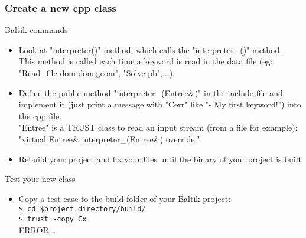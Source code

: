 \documentclass[10pt, hyperref={unicode=true,pdfusetitle, bookmarks=true,bookmarksnumbered=false,bookmarksopen=false, breaklinks=false,pdfborder={0 0 1},backref=true,colorlinks=true,linkcolor=darkblue,pageanchor, urlcolor=darkblue}]{beamer}
\begin{document}
\begin{frame}
\frametitle{Create a new cpp class}
\begin{block}{Baltik commands}

\begin{itemize}
\item Look at "interpreter()" method, which calls the "interpreter\_()" method. \\
 This method is called each time a keyword is read in the data file (eg: "Read\_file dom dom.geom", "Solve pb",...).

\item Define the public method "interpreter\_(Entree\&)" in the include file and implement it
(just print a message with "Cerr" like "- My first keyword!") into the cpp file. \\
"Entree" is a TRUST class to read an input stream (from a file for example):\\
"virtual Entree\& interpreter\_(Entree\&) override;"

\item Rebuild your project and fix your files until the binary of your project is built %
\end{itemize}
\end{block}

\begin{block}{Test your new class}
\begin{itemize}
\item Copy a test case to the build folder of your Baltik project:\\
\texttt{\$ cd \$project\_directory/build/}\\
\texttt{\$ trust -copy Cx}\\
ERROR...

\end{itemize}
\end{block}
\end{frame}
\end{document}
